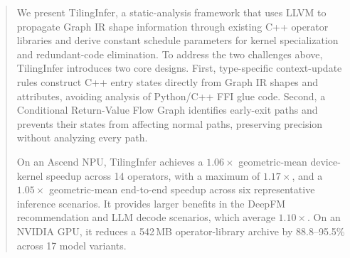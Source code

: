 \begin{abstract}
{\color{red}%
\par}
{\color{blue}%
We present TilingInfer, a static-analysis framework that uses LLVM to propagate Graph IR shape information through existing C++ operator libraries and derive constant schedule parameters for kernel specialization and redundant-code elimination. To address the two challenges above, TilingInfer introduces two core designs. First, type-specific context-update rules construct C++ entry states directly from Graph IR shapes and attributes, avoiding analysis of Python/C++ FFI glue code. Second, a Conditional Return-Value Flow Graph identifies early-exit paths and prevents their states from affecting normal paths, preserving precision without analyzing every path.
\par}

{\color{red}%
\par}
{\color{blue}%
On an Ascend NPU, TilingInfer achieves a $1.06\times$ geometric-mean device-kernel speedup across 14 operators, with a maximum of $1.17\times$, and a $1.05\times$ geometric-mean end-to-end speedup across six representative inference scenarios. It provides larger benefits in the DeepFM recommendation and LLM decode scenarios, which average $1.10\times$. On an NVIDIA GPU, it reduces a 542\,MB operator-library archive by 88.8--95.5\% across 17 model variants.
\par}
\end{abstract}
